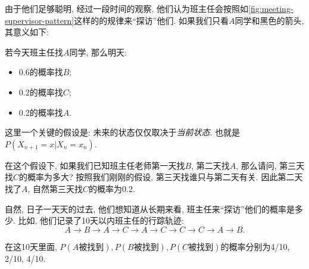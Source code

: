     由于他们足够聪明, 经过一段时间的观察, 他们认为班主任会按照如\cref{fig:meeting-supervisor-pattern}这样的的规律来``探访''他们.  如果我们只看$A$同学和黑色的箭头, 其意义如下: 

    若今天班主任找$A$同学, 那么明天: 
    \begin{itemize}
        \item 0.6的概率找$B$;
        \item 0.2的概率找$C$;
        \item 0.2的概率找$A$.
    \end{itemize}

    这里一个关键的假设是: 未来的状态仅仅取决于\emph{当前状态}. 也就是$P(X_{n+1}=x|X_n=x_n)$.
    
    在这个假设下, 如果我们已知班主任老师第一天找$B$, 第二天找$A$, 那么请问, 第三天找$C$的概率为多大? 按照我们刚刚的假设, 第三天找谁只与第二天有关. 因此第二天找了$A$, 自然第三天找$C$的概率为0.2. 

    自然, 日子一天天的过去, 他们想知道从长期来看, 班主任来``探访''他们的概率是多少. 比如, 他们记录了10天以内班主任的行踪轨迹: 
    $$
    A \to B \to A\to C \to A \to C\to C\to C\to A\to B.
    $$

    在这10天里面, $P(A\text{被找到}), P(B\text{被找到}),P(C\text{被找到})$的概率分别为4/10, 2/10, 4/10. 
    
    